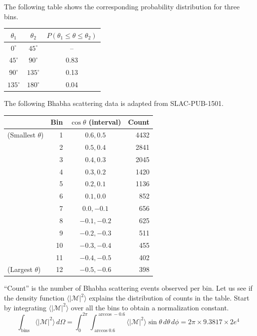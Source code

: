 \documentclass[12pt]{article}
\begin{document}
\noindent
The following table shows the corresponding probability distribution for three bins.

\begin{center}
\begin{tabular}{|c|c|c|}
\hline
$\theta_1$ & $\theta_2$ & $P(\theta_1\le\theta\le\theta_2)$\\
\hline
$0^\circ$ & $45^\circ$ & -- \\
$45^\circ$ & $90^\circ$ & 0.83 \\
$90^\circ$ & $135^\circ$ & 0.13 \\
$135^\circ$ & $180^\circ$ & 0.04 \\
\hline
\end{tabular}
\end{center}

\newpage
\noindent
The following Bhabha scattering data is adapted from SLAC-PUB-1501.

\begin{center}
\begin{tabular}{|lr|c|r|}
\hline
& Bin & $\cos\theta$ (interval) & Count\\
\hline
(Smallest $\theta$) & 1 & $0.6, 0.5$ & 4432\\
& 2 & $0.5, 0.4$ & 2841\\
& 3 & $0.4, 0.3$ & 2045\\
& 4 & $0.3, 0.2$ & 1420\\
& 5 & $0.2, 0.1$ & 1136\\
& 6 & $0.1, 0.0$ & 852\\
& 7 & $0.0, -0.1$ & 656\\
& 8 & $-0.1, -0.2$ & 625\\
& 9 & $-0.2, -0.3$ & 511\\
& 10 & $-0.3, -0.4$ & 455\\
& 11 & $-0.4, -0.5$ & 402\\
(Largest $\theta$) & 12 & $-0.5, -0.6$ & 398\\
\hline
\end{tabular}
\end{center}

\noindent
``Count'' is the number of Bhabha scattering events observed per bin.
Let us see if the density function $\langle|\mathcal{M}|^2\rangle$ explains the distribution of counts in the table.
Start by integrating $\langle|\mathcal{M}|^2\rangle$ over all the bins to obtain a normalization constant.
\begin{equation*}
\int_\text{bins}\langle|\mathcal{M}|^2\rangle\,d\Omega
=\int_0^{2\pi}\int_{\arccos 0.6}^{\arccos -0.6}\langle|\mathcal{M}|^2\rangle\sin\theta\,d\theta\,d\phi
=2\pi\times9.3817\times 2e^4
\end{equation*}
\end{document}
